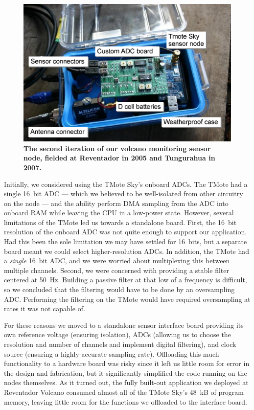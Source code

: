 \begin{figure}[t]
\begin{center}
\includegraphics[width=1.0\hsize]{./figs/OSDI2006/2006-VolcanoMote.eps}
\end{center}
\caption{{\bf The second iteration of our volcano monitoring sensor
node, fielded at Reventador in 2005 and Tungurahua in 2007.}}
\label{fig-2005volcanomote}
\end{figure}

Initially, we considered using the TMote Sky's onboard ADCs.  The TMote had a
single 16~bit ADC --- which we believed to be well-isolated from other
circuitry on the node --- and the ability perform DMA sampling from the ADC
into onboard RAM while leaving the CPU in a low-power state.  However,
several limitations of the TMote led us towards a standalone board. First,
the 16~bit resolution of the onboard ADC was not quite enough to support our
application. Had this been the sole limitation we may have settled for
16~bits, but a separate board meant we could select higher-resolution ADCs.
In addition, the TMote had a \textit{single} 16~bit ADC, and we were worried
about multiplexing this between multiple channels.  Second, we were concerned
with providing a stable filter centered at 50~Hz.  Building a passive filter
at that low of a frequency is difficult, so we concluded that the filtering
would have to be done by an oversampling ADC.  Performing the filtering on
the TMote would have required oversampling at rates it was not capable of.

For these reasons we moved to a standalone sensor interface board providing
its own reference voltage (ensuring isolation), ADCs (allowing us to choose
the resolution and number of channels and implement digital filtering), and
clock source (ensuring a highly-accurate sampling rate).  Offloading this
much functionality to a hardware board was risky since it left us little room
for error in the design and fabrication, but it significantly simplified the
code running on the nodes themselves.  As it turned out, the fully
built-out application we deployed at Reventador Volcano consumed almost all
of the TMote Sky's 48~kB of program memory, leaving little room for the
functions we offloaded to the interface board.

